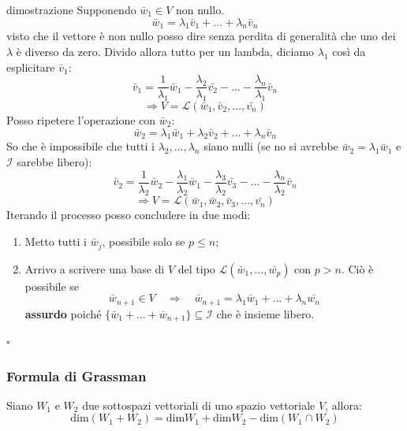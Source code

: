 \documentclass[x11names]{article}
\newcommand*{\QEDB}{\null\nobreak\hfill\ensuremath{\square}}%
\begin{document}
\begin{es}{dimostrazione}
	Supponendo $\bar{w}_{1} \in V$ non nullo.
	\[
	\bar{w}_{1}  = \lambda_1 \bar{v}_{1} + \dots + \lambda_n \bar{v}_{n}
	\]
	visto che il vettore è non nullo posso dire senza perdita di generalità che uno dei $\lambda$ è diverso da zero. Divido allora tutto per un lambda, diciamo $\lambda_1$ così da esplicitare $\bar{v}_{1}$:
	\[
	\bar{v}_{1} = \frac{1}{\lambda_1}\bar{w}_{1} - \frac{\lambda_{2}}{\lambda_{1}}\bar{v_{2}} - \dots - \frac{\lambda_{n}}{\lambda_{1}}\bar{v}_{n}
	\] 
	\[
	\Longrightarrow V = \mathcal{L}\left(\bar{w}_{1},\bar{v}_{2},\dots,\bar{v_{n}}\right)
	\]
	Posso ripetere l'operazione con $\bar{w}_{2}$:
	\[
	\bar{w}_{2} = \lambda_{1}\bar{w}_{1} + \lambda_2\bar{v}_{2} + \dots + \lambda_n \bar{v}_{n}
	\]
	So che è impossibile che tutti i $\lambda_{2}, \dots , \lambda_{n}$ siano nulli (se no si avrebbe $\bar{w}_{2} = \lambda_{1} \bar{w}_{1}$ e $\mathcal{I}$ sarebbe libero):
	\[
	\bar{v}_{2} = \frac{1}{\lambda_2}\bar{w}_{2} - \frac{\lambda_{1}}{\lambda_2}\bar{w}_{1} - \frac{\lambda_{3}}{\lambda_{2}}\bar{v_{3}} - \dots - \frac{\lambda_{n}}{\lambda_{2}}\bar{v}_{n}
	\]
	\[
	\Longrightarrow V =  \mathcal{L}\left(\bar{w}_{1},\bar{w}_{2},\bar{v}_{3},\dots,\bar{v_{n}}\right)
	\]
	Iterando il processo posso concludere in due modi:
	\begin{enumerate}
		\item Metto tutti i $\bar{w}_{j}$, possibile solo se $p \leq n$;
		\item Arrivo a scrivere una base di $V$ del tipo $\mathcal{L}\left(\bar{w}_{1},\dots,\bar{w_{p}}\right)$ con $p > n$. Ciò è possibile se 
		\[
		\bar{w}_{n+1} \in V \quad \Longrightarrow \quad \bar{w}_{n+1}  = \lambda_{1}\bar{w}_{1} + \dots + \lambda_{n}\bar{w_{n}}
		\]
		\textbf{assurdo} poiché $\{\bar{w}_{1} + \dots + \bar{w}_{n+1}\} \subseteq \mathcal{I}$ che è insieme libero.
	\end{enumerate} \QEDB
\end{es}


				\subsubsection{Formula di Grassman}
				Siano $W_{1}$ e $W_{2}$ due sottospazi vettoriali di uno spazio vettoriale $V$, allora:
				\[
				\text{dim}\left(W_{1} + W_{2}\right) = \text{dim}W_{1} + \text{dim}W_{2} - \text{dim}\left(W_{1} \cap W_{2}\right)
				\]
\end{document}
